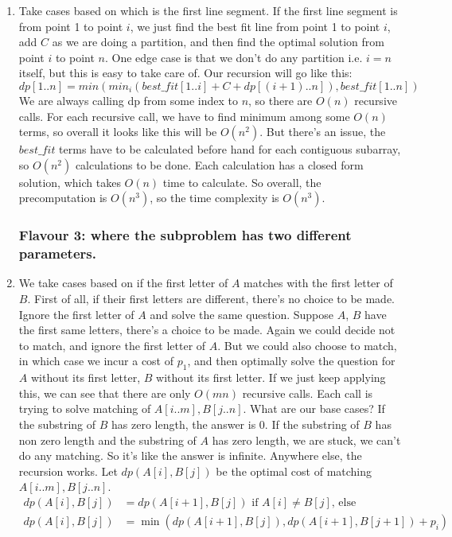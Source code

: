 \documentclass[12pt]{report}
\begin{document}
\begin{enumerate}[label=\textbf{\arabic*.}]
  \item Take cases based on which is the first line segment. If the first line segment is from point 1 to point $i$, we just find the best fit line from point 1 to point $i$, add $C$ as we are doing a partition, 
  and then find the optimal solution from point $i$ to point $n$. One edge case is that we don't do any partition i.e. $i = n$ itself, but this is easy to take care of. Our recursion will go like this:
  \[dp[1 .. n] = min (min_i (best\_fit[1 .. i] + C + dp[(i+1) .. n]), best\_fit[1 .. n]) \]
  We are always calling dp from some index to $n$, so there are $O(n)$ recursive calls. For each recursive call, we have to find minimum among some $O(n)$ terms, so overall it looks like this will be $O(n^2)$.
  But there's an issue, the $best\_fit$ terms have to be calculated before hand for each contiguous subarray, so $O(n^2)$ calculations to be done. Each calculation has a closed form solution, which takes $O(n)$
  time to calculate. So overall, the precomputation is $O(n^3)$, so the time complexity is $O(n^3)$.

  \subsubsection*{Flavour 3: where the subproblem has two diﬀerent parameters.}

  \item We take cases based on if the first letter of $A$ matches with the first letter of $B$. First of all, if their first letters are different, there's no choice to be made. Ignore the first letter of $A$ and
  solve the same question. Suppose $A$, $B$ have the first same letters, there's a choice to be made. Again we could decide not to match, and ignore the first letter of $A$. But we could also choose to match, in 
  which case we incur a cost of $p_1$, and then optimally solve the question for $A$ without its first letter, $B$ without its first letter. If we just keep applying this, we can see that there are only $O(mn)$ 
  recursive calls. Each call is trying to solve matching of $A[i .. m], B[j .. n]$. What are our base cases? If the substring of $B$ has zero length, the answer is $0$. If the substring of $B$ has non zero length
  and the substring of $A$ has zero length, we are stuck, we can't do any matching. So it's like the answer is infinite. Anywhere else, the recursion works. Let $dp(A[i], B[j])$ be the optimal cost of matching 
  $A[i..m], B[j..n]$.
  \begin{align*}
    dp(A[i], B[j]) &= dp(A[i+1], B[j]) \text{ if } A[i] \neq B[j] \text{, else} \\
    dp(A[i], B[j]) &= \min(dp(A[i+1], B[j]), dp(A[i+1], B[j+1]) + p_i)
  \end{align*}
  


\end{enumerate}
\end{document}
